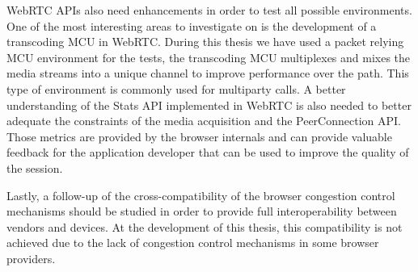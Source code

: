 WebRTC APIs also need enhancements in order to test all possible environments. One of the most interesting areas to investigate on is the development of a transcoding MCU in WebRTC. During this thesis we have used a packet relying MCU environment for the tests, the transcoding MCU multiplexes and mixes the media streams into a unique channel to improve performance over the path. This type of environment is commonly used for multiparty calls. A better understanding of the Stats API implemented in WebRTC is also needed to better adequate the constraints of the media acquisition and the PeerConnection API. Those metrics are provided by the browser internals and can provide valuable feedback for the application developer that can be used to improve the quality of the session.

Lastly, a follow-up of the cross-compatibility of the browser congestion control mechanisms should be studied in order to provide full interoperability between vendors and devices. At the development of this thesis, this compatibility is not achieved due to the lack of congestion control mechanisms in some browser providers.